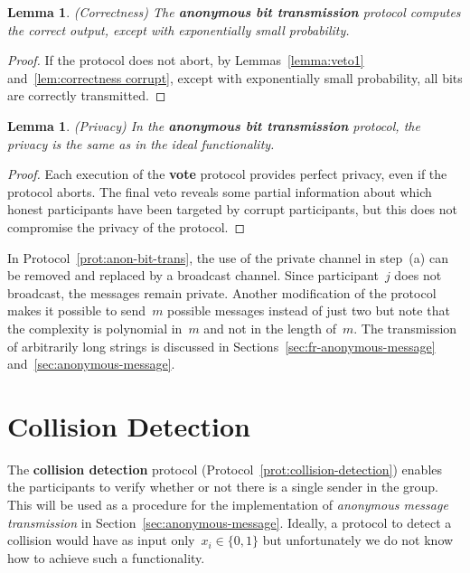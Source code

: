 \documentclass[11pt]{article}
\newtheorem{lemma}[theorem]{Lemma}
\begin{document}
\begin{lemma}(Correctness)
The \textbf{anonymous bit transmission} protocol computes the
correct output, except with exponentially small probability.
\end{lemma}

\begin{proof}
If the protocol does not abort, by Lemmas~\ref{lemma:veto1}
and~\ref{lem:correctness corrupt}, except with exponentially small
probability, all bits are correctly transmitted.
\end{proof}

\begin{lemma}(Privacy)
In the \textbf{anonymous bit transmission} protocol, the privacy is
the same as in the ideal functionality.
\end{lemma}

\begin{proof}
Each execution of the \textbf{vote} protocol  provides perfect
privacy, even if the protocol aborts.
 The final veto reveals some partial information about which honest participants
have been targeted by corrupt participants, but this does not
compromise the privacy of the protocol.\end{proof}

In Protocol~\ref{prot:anon-bit-trans}, the use of the private
channel in step~(a) can be removed and replaced by a broadcast
channel. Since participant~$j$ does not broadcast, the messages
remain private. Another  modification of the protocol makes it
possible to send~$m$ possible messages instead of just two but note
that the complexity is polynomial in~$m$ and not in the length
of~$m$. The transmission of arbitrarily long strings is discussed in
Sections~\ref{sec:fr-anonymous-message}
and~\ref{sec:anonymous-message}.


\section{Collision Detection}
\label{sec:collision}

The \textbf{collision detection} protocol
(Protocol~\ref{prot:collision-detection}) enables the participants
to verify whether or not there is a single sender in the group. This
will be used as a procedure for the implementation of
\emph{anonymous message transmission} in
Section~\ref{sec:anonymous-message}. Ideally, a protocol to detect a
collision would have as input only~$x_i \in \{0,1\}$ but
unfortunately we do not know how to achieve such a functionality.
\end{document}
